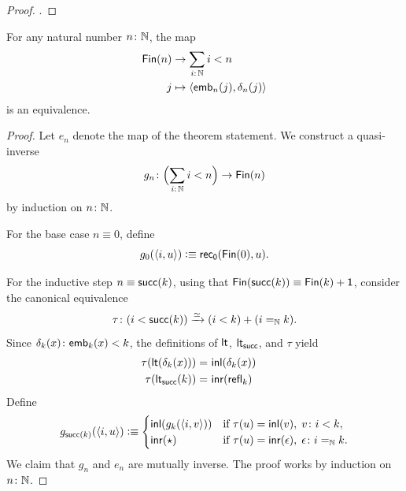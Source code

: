 \begin{proof}
    \citep[Chapter 3]{caniglia2025hott}.
\end{proof}

\begin{thm}\label{thm:fin-equiv-bound}
    For any natural number\/ $n\colon\N$, the map
    \begin{align*}
        \fun{Fin}(n)&\to\sum_{i\colon\N}i<n\\
        j&\mapsto\dep{\fun{emb}_n(j),\delta_n(j)}
    \end{align*}
    is an equivalence.
\end{thm}

\begin{proof}
    Let $e_n$ denote the map of the theorem statement. We construct a quasi-inverse
    \[
        g_n\colon\Bigl(\sum_{i\colon\N}i<n\Bigr)
            \to\fun{Fin}(n)
    \]
    by induction on $n\colon\N$.

    For the base case $n\equiv0$, define 
    \[
        g_0(\langle i,u\rangle)
            \mathrel{\vcentcolon}\equiv\mathsf{rec}_{\mathsf{0}}(\mathsf{Fin}(0),u).
    \]

    For the inductive step $n\equiv\mathsf{succ}(k)$, using that $\mathsf{Fin}(\mathsf{succ}(k))\equiv\mathsf{Fin}(k)+\mathsf{1}$, consider the canonical equivalence
    \[
        \tau\colon(i<\fun{succ}(k))
            \xto\simeq(i<k)+(i\eq\N k).
    \]
    Since $\delta_k(x)\colon\fun{emb}_k(x)<k$, the definitions of $\mathsf{lt}$, $\mathsf{lt}_{\mathsf{succ}}$, and $\tau$ yield
    \begin{align}
        \tau(\mathsf{lt}(\delta_k(x)))
            &\mathrel{=_{}}\mathsf{inl}(\delta_k(x))
                &&\label{eq:tau-lt=inl}\\
        \tau(\mathsf{lt}_{\mathsf{succ}}(k))
            &\mathrel{=_{}}\mathsf{inr}(\mathsf{refl}_k)
                &&\label{eq:tau-lt_succ=inr}
    \end{align}
    Define
    \begin{equation}\label{eq:g_succ}
        g_{\fun{succ}(k)}(\dep{i,u})
            \defeq
                \begin{cases}
                    \fun{inl}(g_k(\dep{i,v}))
                        &\text{if }\tau(u)=\fun{inl}(v),\; v\colon i<k,\\
                    \fun{inr}(\fstar)
                        &\text{if }\tau(u)=\fun{inr}(\epsilon),\; \epsilon\colon i\eq\N k.
                \end{cases}
    \end{equation}
    We claim that $g_n$ and $e_n$ are mutually inverse. The proof works by induction on $n\colon\N$.
    

\end{proof}
